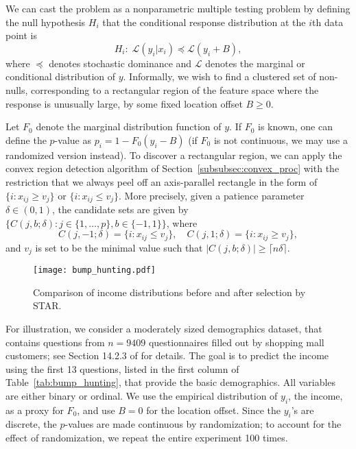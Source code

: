 \documentclass{biometrika}
\renewcommand{\star}{STAR}
\newcommand{\1}{\mathbf{1}}
\begin{document}
We can cast the problem as a nonparametric multiple testing problem by defining the null hypothesis $H_i$ that the conditional response distribution at the $i$th data point is 
\[
H_i:\; \mathcal{L}(y_i | x_{i})\preceq \mathcal{L}(y_i + B),
\]
where $\preceq$ denotes stochastic dominance and $\mathcal{L}$ denotes the marginal or conditional distribution of $y$. Informally, we wish to find a clustered set of non-nulls, corresponding to a rectangular region of the feature space where the response is unusually large, by some fixed location offset $B\geq 0$.

Let $F_{0}$ denote the marginal distribution function of $y$. If $F_{0}$ is known, one can define the $p$-value as $p_{i} = 1 - F_{0}(y_{i}-B)$ (if $F_0$ is not continuous, we may use a randomized version instead). To discover a rectangular region, we can apply the convex region detection algorithm of Section~\ref{subsubsec:convex_proc} with the restriction that we always peel off an axis-parallel rectangle in the form of $\{i: x_{ij}\ge v_{j}\}$ or $\{i: x_{ij}\le v_{j}\}$. More precisely, given a patience parameter $\delta\in (0, 1)$, the candidate sets are given by $\{C(j, b; \delta): j \in \{1,\ldots, p\}, b \in \{-1, 1\}\}$, where 
\[C(j, -1; \delta) = \{i: x_{ij}\le v_{j}\}, \quad C(j, 1; \delta) = \{i: x_{ij}\ge v_{j}\},\]
and $v_{j}$ is set to be the minimal value such that $|C(j, b; \delta)| \ge \lceil n \delta\rceil$. 

\begin{figure}[htp]
  \centering
  \texttt{[image: bump\_hunting.pdf]}
  \caption{Comparison of income distributions before and after selection by \star.}\label{fig:income_dist}
\end{figure}

For illustration, we consider a moderately sized demographics dataset, that contains questions from  $n = 9409$ questionnaires filled out by shopping mall customers; see Section 14.2.3 of \cite{ESL} for details. The goal is to predict the income using the first 13 questions, listed in the first column of Table~\ref{tab:bump_hunting}, that provide the basic demographics. All variables are either binary or ordinal. We use the empirical distribution of $y_{i}$, the income, as a proxy for $F_{0}$, and use $B=0$ for the location offset. Since the $y_{i}$'s are discrete, the $p$-values are made continuous by randomization; to account for the effect of randomization, we repeat the entire experiment 100 times. 
\end{document}
